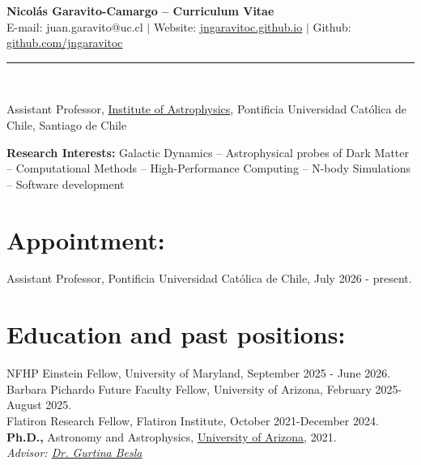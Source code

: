 \documentclass[14pt]{article}
\begin{document}
\begin{center}
\indent \textbf{\LARGE Nicol\'as Garavito-Camargo -- Curriculum Vitae} \\
E-mail: juan.garavito@uc.cl $|$ Website: \href{http://jngaravitoc.github.io/Garavito-Camargo}{jngaravitoc.github.io} $|$ Github: \href{http://www.github.com/jngaravitoc}{github.com/jngaravitoc}\\
\indent \rule{17cm}{0.4pt}\\
\end{center}

\fontsize{11}{11}\selectfont

\begin{center}
  Assistant Professor, \href{https://astro.uc.cl/}{Institute of Astrophysics}, Pontificia Universidad Cat\'olica de Chile, Santiago de Chile\\
\end{center}

\begin{center}
\textbf{Research Interests:} Galactic Dynamics -- Astrophysical probes
  of Dark Matter -- Computational Methods -- High-Performance Computing --
N-body Simulations -- Software development\\
\end{center}


\section*{Appointment:}

Assistant Professor, Pontificia Universidad Cat\'olica de Chile, July 2026 - present.  

\section*{Education and past positions:}

\indent  
\indent NFHP Einstein Fellow, University of Maryland, September 2025 - June 2026.\\

\indent Barbara Pichardo Future Faculty Fellow, University of Arizona, February 2025-August 2025. \\

\indent Flatiron Research Fellow, Flatiron Institute, October 2021-December 2024.\\

\textbf{Ph.D.,} Astronomy and Astrophysics, \href{https://www.as.arizona.edu/}{University of Arizona}, 2021.\\
\indent \textit{Advisor: \href{https://sites.google.com/view/thebeslagroup/home}{Dr. Gurtina Besla}}\\
\end{document}
